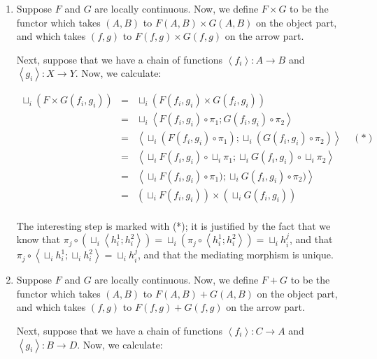\documentclass[12pt]{article}
\begin{document}
\begin{enumerate}
\item Suppose $F$ and $G$ are locally continuous. Now, we define 
$F \times G$ to be the functor which takes $(A,B)$ to $F(A,B) \times G(A,B)$
on the object part, and which takes $(f,g)$ to $F(f,g) \times G(f,g)$ on
the arrow part.

Next, suppose that we have a chain of functions $\left<f_i\right> : A \to B$ and
$\left<g_i\right> : X \to Y$. Now, we calculate:

\begin{displaymath}
\begin{array}{lcl}
  \sqcup_i (F \times G (f_i,g_i)) 
   & = & \sqcup_i (F(f_i,g_i) \times G(f_i,g_i)) \\
   & = & \sqcup_i \left<F(f_i,g_i) \circ \pi_1; 
                        G(f_i,g_i) \circ \pi_2\right>\\
   & = & \left<\sqcup_i (F(f_i,g_i) \circ \pi_1);
               \sqcup_i (G(f_i,g_i) \circ \pi_2)\right> \;\;\;\;(*)\\
   & = & \left<\sqcup_i F(f_i,g_i) \circ \sqcup_i \pi_1;
               \sqcup_i G(f_i,g_i) \circ \sqcup_i \pi_2\right>\\
   & = & \left<\sqcup_i F(f_i,g_i) \circ \pi_1);
               \sqcup_i G(f_i,g_i) \circ \pi_2)\right>\\
   & = & (\sqcup_i F(f_i,g_i)) \times (\sqcup_i G(f_i,g_i))\\
\end{array}
\end{displaymath}

The interesting step is marked with (*); it is justified by the fact
that we know that $\pi_j \circ (\sqcup_i \left<h^1_i;h^2_i\right>) = 
\sqcup_i (\pi_j \circ \left<h^1_i;h^2_i\right>) = 
\sqcup_i h^j_i$,
and that $\pi_j \circ \left<\sqcup_i h^1_i; \sqcup_i h^2_i\right> = \sqcup_i h^j_i$,
and that the mediating morphism is unique. 


\item Suppose $F$ and $G$ are locally continuous. Now, we define 
$F + G$ to be the functor which takes $(A,B)$ to $F(A,B) + G(A,B)$
on the object part, and which takes $(f,g)$ to $F(f,g) + G(f,g)$ on
the arrow part.

Next, suppose that we have a chain of functions $\left<f_i\right> : C \to A$ and
$\left<g_i\right> : B \to D$. Now, we calculate:


\end{enumerate}
\end{document}
